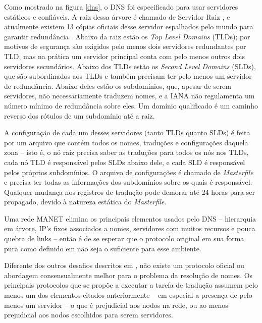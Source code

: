 Como mostrado na figura \ref{dns}, o DNS foi especificado para usar servidores
estáticos e confiáveis. A raiz dessa árvore é chamado de Servidor Raiz
\cite{rfc1035}, e atualmente existem 13 cópias oficiais desse servidor espalhados
pelo mundo para garantir redundância \cite{iana}. Abaixo da raiz estão os
\textit{Top Level Domains} (TLDs); por motivos de segurança são exigidos pelo
menos dois servidores redundantes por TLD, mas na prática um servidor principal
conta com pelo menos outros dois servidores secundários. Abaixo dos TLDs estão
os \textit{Second Level Domains} (SLDs), que são subordinados aos TLDs e também
precisam ter pelo menos um servidor de redundância. Abaixo deles estão os subdomínios,
que, apesar de serem servidores, não necessariamente traduzem nomes, e a IANA não
regulamenta um número mínimo de redundância sobre eles. Um domínio qualificado é
um caminho reverso dos rótulos de um subdomínio até a raiz.

A configuração de cada um desses servidores (tanto TLDs quanto SLDs) é feita por
um arquivo que contém todos os nomes, traduções e configurações daquela zona -- 
isto é, o nó raiz precisa saber as traduções para todos os nós nos TLDs, cada nó
TLD é responsável pelos SLDs abaixo dele, e cada SLD é responsável pelos próprios
subdomínios. O arquivo de configurações é chamado de \textit{Masterfile} e precisa
ter todas as informações dos subdomínios sobre os quais é responsável. Qualquer
mudança nos registros de tradução pode demorar até 24 horas para ser propagado,
devido à natureza estática do \textit{Masterfile}.

Uma rede MANET elimina os principais elementos usados pelo DNS -- hierarquia em
árvore, IP's fixos associados a nomes, servidores com muitos recursos e pouca
quebra de links -- então é de se esperar que o protocolo original em sua forma
pura como definido em \cite{rfc1035} não seja o suficiente para esse ambiente.

Diferente dos outros desafios descritos em \cite{manet-state}, não existe um
protocolo oficial ou abordagem consensualmente melhor para o problema da
resolução de nomes. Os principais protocolos que se propõe a executar a tarefa
de tradução assumem pelo menos um dos elementos citados anteriormente -- em
especial a presença de pelo menos um servidor -- o que é prejudicial aos nodos
na rede, ou ao menos prejudicial aos nodos escolhidos para serem servidores.

